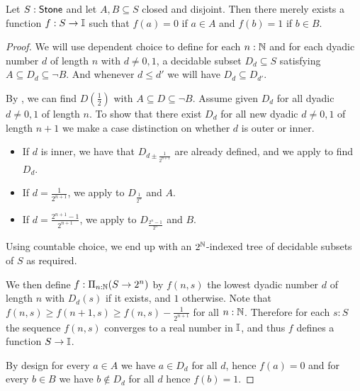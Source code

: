 \begin{lemma}
  Let $S:\mathsf{Stone}$ and let $A,B\subseteq S$ closed and disjoint. 
  Then there merely exists a function $f:S \to \mathbb{I}$ such that 
  $f(a) = 0$ if $a\in A$ and $f(b) = 1$ if $b\in B$. 
\end{lemma}
\begin{proof}
  We will use dependent choice to define for each $n:\mathbb{N}$ 
  and for each dyadic number $d$ of length $n$ with $d\neq 0,1$, 
  a decidable subset $D_d\subseteq S$ satisfying $A\subseteq  D_d\subseteq \neg B$. 
  And whenever $d \leq d'$ we will have $D_d \subseteq D_{d'}$.

  By , we can find $D(\frac{1}{2})$ with $A\subseteq D \subseteq \neg B$. 
  Assume given $D_d$ for all dyadic $d\neq 0,1$ of length $n$. 
  To show that there exist $D_d$ for all new dyadic $d\neq 0,1$ of length $n+1$ 
  we make a case distinction on whether $d$ is outer or inner. 
  \begin{itemize}
    \item If $d$ is inner, we have that $D_{d \pm \frac{1}{2^{n+1}}}$ are already defined, and we apply 
       to find $D_d$. 
    \item If $d= \frac{1}{2^{n+1}}$, we apply  to $D_{\frac{1}{2^n}}$ and $A$. 
    \item If $d= \frac{2^{n+1}-1}{2^{n+1}}$, we apply  to $D_{\frac{2^n-1}{2^n}}$ and $B$. 
  \end{itemize}
  Using countable choice, we end up with an $2^{\mathbb{N}}$-indexed tree of decidable subsets of $S$ as required. 
  
  We then define $f:\Pi_{n:\mathbb{N}} (S \to 2^n)$ by 
  $f(n,s) $ the lowest dyadic number $d$ of length $n$ with $D_d(s)$ if it exists, and $1$ otherwise. 
  Note that $f(n,s) \geq f(n+1,s) \geq f(n,s) -\frac{1}{2^{n+1}}$  for all $n:\mathbb{N}$. 
  Therefore for each $s:S$ the sequence $f(n,s)$ converges to a real number in $\mathbb{I}$, 
  and thus $f$ defines a function $S \to \mathbb{I}$. 
  
  By design for every $a\in A$ we have $a\in D_d$ for all $d$, hence $f(a) = 0$ and 
  for every $b\in B$ we have $b\notin D_d$ for all $d$ hence $f(b) = 1$. 
\end{proof} 
